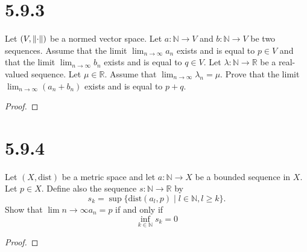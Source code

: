 \documentclass{article}
\theoremstyle{mytheoremstyle}
\theoremstyle{mytheoremstyle}
\theoremstyle{myproblemstyle}
\begin{document}
    \section{5.9.3}
    \begin{problem}
        Let $(V, \norm{\cdot})$ be a normed vector space. Let $a: \mathbb{N} \to V$ and $b: \mathbb{N} \to V$ be two sequences.
        Assume that the limit $\displaystyle\lim_{n\to\infty}a_n$ exists and is equal to $p \in V$ and that the limit $\displaystyle\lim_{n\to\infty}b_n$
        exists and is equal to $q \in V$. Let $\lambda: \mathbb{N} \to \mathbb{R}$ be a real-valued sequence. Let $\mu \in \mathbb{R}$.
        Assume that $\displaystyle\lim_{n\to\infty}\lambda_n = \mu$. Prove that the limit $\displaystyle\lim_{n\to\infty}(a_n + b_n)$ exists
        and is equal to $p + q$.
    \end{problem}
    \begin{proof}
    \end{proof}

    \section{5.9.4}
    \begin{problem}
        Let $(X, \text{dist})$ be a metric space and let $a: \mathbb{N} \to X$ be a bounded sequence in $X$. Let $p \in X$.
        Define also the sequence $s: \mathbb{N} \to \mathbb{R}$ by
        $$s_k = \sup \{\text{dist}(a_l,p) \mid l \in \mathbb{N}, l \ge k\}.$$
        Show that $\displaystyle\lim{n\to\infty}a_n = p$ if and only if
        $$\inf_{k\in\mathbb{N}}s_k = 0$$
    \end{problem}
    \begin{proof}
    \end{proof}
    
\end{document}
